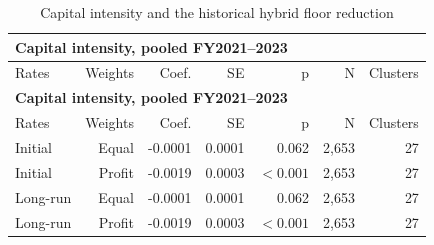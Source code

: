 {\small\setlength{\LTpre}{4pt}\setlength{\LTpost}{4pt}
\begin{longtable}{@{}lrrrrrr@{}}
\caption{Capital intensity and the historical hybrid floor reduction}\label{tab:tab_v2_app_table3_h5_regression} \\
\multicolumn{7}{l}{\textbf{Capital intensity, pooled FY2021–2023}} \\
\toprule
Rates & Weights & Coef. & SE & p & N & Clusters \\
\midrule
\endfirsthead
\multicolumn{7}{l}{\textbf{Capital intensity, pooled FY2021–2023}} \\
\toprule
Rates & Weights & Coef. & SE & p & N & Clusters \\
\midrule
\endhead
\midrule
\endfoot
\bottomrule
\endlastfoot
Initial & Equal & -0.0001 & 0.0001 & 0.062 & 2,653 & 27 \\
Initial & Profit & -0.0019 & 0.0003 & $<0.001$ & 2,653 & 27 \\
Long-run & Equal & -0.0001 & 0.0001 & 0.062 & 2,653 & 27 \\
Long-run & Profit & -0.0019 & 0.0003 & $<0.001$ & 2,653 & 27 \\
\end{longtable}
\par{}\par
}
